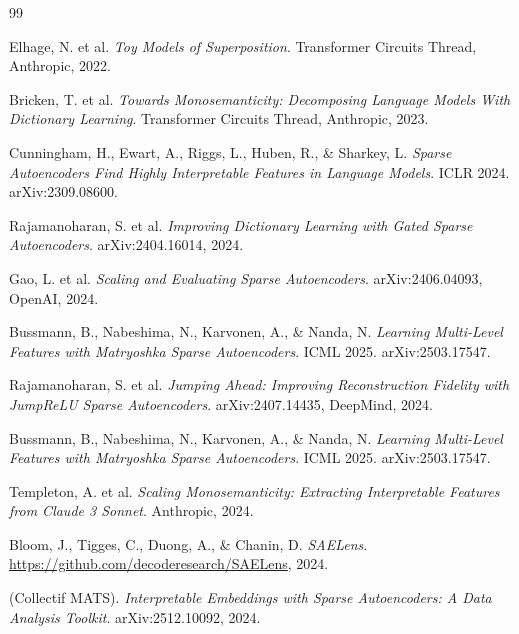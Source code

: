 \documentclass[11pt]{article}
\begin{document}
\newpage
\begin{thebibliography}{99}\small

  Elhage, N. et al.
  \textit{Toy Models of Superposition}.
  Transformer Circuits Thread, Anthropic, 2022.

  Bricken, T. et al.
  \textit{Towards Monosemanticity: Decomposing Language Models With Dictionary Learning}.
  Transformer Circuits Thread, Anthropic, 2023.

  Cunningham, H., Ewart, A., Riggs, L., Huben, R., \& Sharkey, L.
  \textit{Sparse Autoencoders Find Highly Interpretable Features in Language Models}.
  ICLR 2024. arXiv:2309.08600.

  Rajamanoharan, S. et al.
  \textit{Improving Dictionary Learning with Gated Sparse Autoencoders}.
  arXiv:2404.16014, 2024.

  Gao, L. et al.
  \textit{Scaling and Evaluating Sparse Autoencoders}.
  arXiv:2406.04093, OpenAI, 2024.

  Bussmann, B., Nabeshima, N., Karvonen, A., \& Nanda, N.
  \textit{Learning Multi-Level Features with Matryoshka Sparse Autoencoders}.
  ICML 2025. arXiv:2503.17547.

  Rajamanoharan, S. et al.
  \textit{Jumping Ahead: Improving Reconstruction Fidelity with JumpReLU Sparse Autoencoders}.
  arXiv:2407.14435, DeepMind, 2024.

  Bussmann, B., Nabeshima, N., Karvonen, A., \& Nanda, N.
  \textit{Learning Multi-Level Features with Matryoshka Sparse Autoencoders}.
  ICML 2025. arXiv:2503.17547.

  Templeton, A. et al.
  \textit{Scaling Monosemanticity: Extracting Interpretable Features from Claude 3 Sonnet}.
  Anthropic, 2024.

  Bloom, J., Tigges, C., Duong, A., \& Chanin, D.
  \textit{SAELens}. \url{https://github.com/decoderesearch/SAELens}, 2024.

  (Collectif MATS).
  \textit{Interpretable Embeddings with Sparse Autoencoders: A Data Analysis Toolkit}.
  arXiv:2512.10092, 2024.


\end{thebibliography}
\end{document}
